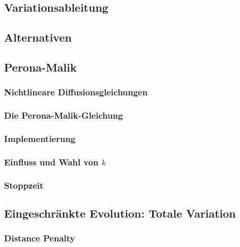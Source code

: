 \documentclass[a4paper, 11pt, accentcolor = tud3b]{tudreport}
\begin{document}
			\subsection{Variationsableitung} %

			\subsection{Alternativen} %

			\subsection{Perona-Malik} %

				\subsubsection{Nichtlineare Diffusionsgleichungen} %

				\subsubsection{Die Perona-Malik-Gleichung} %

				\subsubsection{Implementierung} %

				\subsubsection{Einfluss und Wahl von \(k\)} %

				\subsubsection{Stoppzeit} %

			\subsection{Eingeschränkte Evolution: Totale Variation} %

				\subsubsection{Distance Penalty} %
\end{document}
